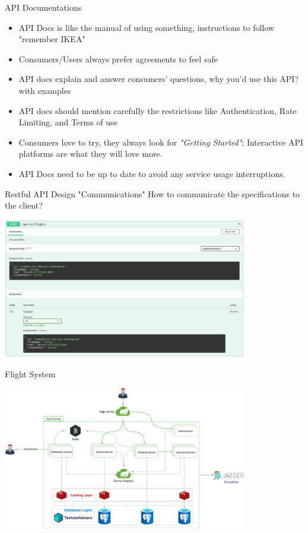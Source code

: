 \documentclass{beamer}
\begin{document}
\begin{frame}[t]{API Documentations}
		\begin{itemize}
			\item<1-> API Docs is like the manual of using something, instructions to follow "remember IKEA" 
			\item<2-> Consumers/Users always prefer agreements to feel safe
			\item<3-> API docs explain and answer consumers' questions, why you'd use this API? with examples
			\item<4-> API docs should mention carefully the restrictions like Authentication, Rate Limiting, and Terms of use
			\item<5-> Consumers love to try, they always look for \textit{"Getting Started"}; Interactive API platforms are what they will love more.
			\item<6-> API Docs need to be up to date to avoid any service usage interruptions.
		\end{itemize}		
	
\end{frame}


\begin{frame}[t]{Restful API Design "Communications"}
		\scriptsize	
		How to communicate the specifications to the client?

		\begin{center}
   			\includegraphics[width=0.8\textwidth, height=0.6\textheight]{img/swagger-doc.png}
		\end{center}		
	
\end{frame}

\begin{frame}[t, label=flight-system-hld]{Flight System}
		\begin{center}
   			\includegraphics[width=0.8\textwidth, height=0.8\textheight]{img/Flight-System.png}
		\end{center}	
\end{frame}
\end{document}

